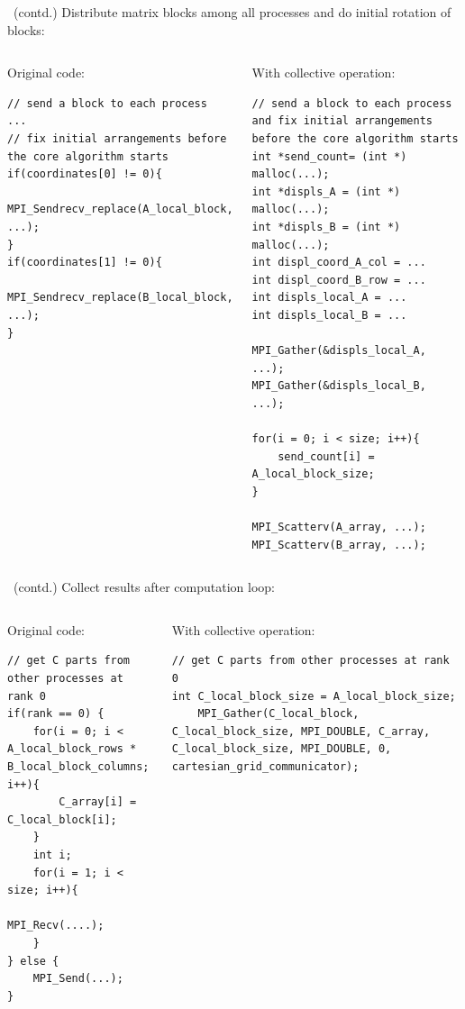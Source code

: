 \documentclass[9pt,pdftex,xcolor=dvipsnames]{beamer}
\begin{document}
\begin{frame}[fragile]{\insertsubsection \ (contd.)}
Distribute matrix blocks among all processes and do initial rotation of blocks:
\begin{columns}
\begin{block}{Original code:}
\begin{lstlisting}
// send a block to each process
...
// fix initial arrangements before the core algorithm starts
if(coordinates[0] != 0){
    MPI_Sendrecv_replace(A_local_block, ...);
}
if(coordinates[1] != 0){
    MPI_Sendrecv_replace(B_local_block, ...);
}
\end{lstlisting}
\end{block}

\begin{block}{With collective operation:}
\begin{lstlisting}	
// send a block to each process and fix initial arrangements before the core algorithm starts
int *send_count= (int *) malloc(...);
int *displs_A = (int *) malloc(...);
int *displs_B = (int *) malloc(...);
int displ_coord_A_col = ... 
int displ_coord_B_row = ...
int displs_local_A = ...
int displs_local_B = ...

MPI_Gather(&displs_local_A, ...);
MPI_Gather(&displs_local_B, ...);  
  
for(i = 0; i < size; i++){
	send_count[i] = A_local_block_size;
}

MPI_Scatterv(A_array, ...);
MPI_Scatterv(B_array, ...);
\end{lstlisting}
\end{block}
\end{columns}
\end{frame}


\begin{frame}[fragile]{\insertsubsection \ (contd.)}
Collect results after computation loop:
\begin{columns}
\begin{block}{Original code:}
\begin{lstlisting}
// get C parts from other processes at rank 0
if(rank == 0) {
    for(i = 0; i < A_local_block_rows * B_local_block_columns; i++){
        C_array[i] = C_local_block[i];
    }
    int i;
    for(i = 1; i < size; i++){
        MPI_Recv(....);
    }
} else {
    MPI_Send(...);
}
\end{lstlisting}
\end{block}

\begin{block}{With collective operation:}
\begin{lstlisting}	
// get C parts from other processes at rank 0
int C_local_block_size = A_local_block_size;
	MPI_Gather(C_local_block, C_local_block_size, MPI_DOUBLE, C_array, C_local_block_size, MPI_DOUBLE, 0, cartesian_grid_communicator);
\end{lstlisting}
\end{block}
\end{columns}
\end{frame}
	
\end{document}

